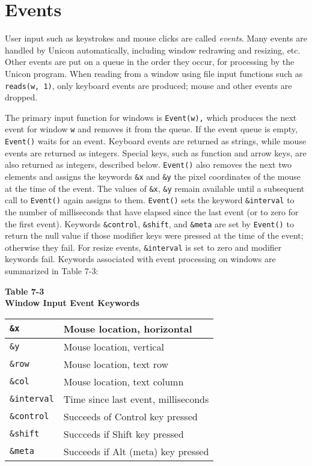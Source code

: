 \section{Events}

User input such as keystrokes and mouse clicks are called
\textit{events}. Many events are handled by Unicon automatically,
including window redrawing and resizing, etc.  Other events are put on
a queue in the order they occur, for processing by the Unicon
program. When reading from a window using file input functions such as
\texttt{reads(w, 1)}, only keyboard events are produced; mouse and
other events are dropped.

The primary input function for windows is \texttt{Event(w),} which
produces the next event for window \texttt{w} and removes it from the
queue. If the event queue is empty, \texttt{Event()} waits for an
event. Keyboard events are returned as strings, while mouse events are
returned as integers. Special keys, such as function and arrow keys,
are also returned as integers, described below. \texttt{Event()} also
removes the next two elements and assigns the keywords \texttt{\&x}
and \texttt{\&y} the pixel coordinates of the mouse at the time of the
event. The values of \texttt{\&x}, \texttt{\&y} remain available until
a subsequent call to \texttt{Event()} again assigns to them.
\texttt{Event()} sets the keyword \texttt{\&interval} to the number of
milliseconds that have elapsed since the last event (or to zero for
the first event). Keywords \texttt{\&control}, \texttt{\&shift}, and
\texttt{\&meta} are set by \texttt{Event()} to return the null value
if those modifier keys were pressed at the time of the event;
otherwise they fail. For resize events, \texttt{\&interval} is set to
zero and modifier keywords fail. Keywords associated with event
processing on windows are summarized in Table 7-3:

\begin{center}
{\sffamily\bfseries Table 7-3} \\
{\sffamily\bfseries Window Input Event Keywords}

\begin{xtabular}{|m{0.90in}|m{2.7in}|}
\texttt{\&x} &
Mouse location, horizontal\\\hline
\texttt{\&y} &
Mouse location, vertical\\\hline
\texttt{\&row} &
Mouse location, text row\\\hline
\texttt{\&col} &
Mouse location, text column\\\hline
\texttt{\&interval} &
Time since last event, milliseconds\\\hline
\texttt{\&control} &
Succeeds of Control key pressed\\\hline
\texttt{\&shift} &
Succceds if Shift key pressed\\\hline
\texttt{\&meta} &
Succeeds if Alt (meta) key pressed\\\hline
\end{xtabular}
\end{center}

